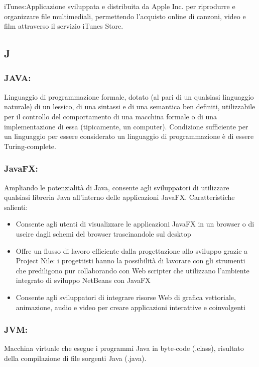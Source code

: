 iTunes:Applicazione sviluppata e distribuita da Apple Inc. per riprodurre e
organizzare file multimediali, permettendo l'acquisto online di canzoni, video e
film attraverso il servizio iTunes Store.

\subsection*{\huge{J}}
\subsubsection*{JAVA:} Linguaggio di programmazione formale, dotato (al pari di
un qualsiasi linguaggio naturale) di un lessico, di una sintassi e di una semantica ben
definiti, utilizzabile per il controllo del comportamento di una macchina
formale o di una implementazione di essa (tipicamente, un computer). Condizione
sufficiente per un linguaggio per essere considerato un linguaggio di
programmazione \`e di essere Turing-complete.

\subsubsection*{JavaFX:} Ampliando le potenzialit\`a di Java, consente agli
sviluppatori di utilizzare qualsiasi libreria Java all'interno delle applicazioni JavaFX.
Caratteristiche salienti:
\begin{itemize}
\item Consente agli utenti di visualizzare le applicazioni JavaFX in un browser
o di uscire dagli schemi del browser trascinandole sul desktop 
\item Offre un flusso di lavoro efficiente dalla progettazione allo sviluppo
grazie a Project Nile: i progettisti hanno la possibilit\`a di lavorare con gli strumenti
che prediligono pur collaborando con Web scripter che utilizzano l'ambiente
integrato di sviluppo NetBeans con JavaFX
\item Consente agli sviluppatori di integrare risorse Web di grafica vettoriale,
animazione, audio e video per creare applicazioni interattive e coinvolgenti
\end{itemize}

\subsubsection*{JVM:} Macchina virtuale che esegue i programmi Java in byte-code
(.class), risultato della compilazione di file sorgenti Java (.java).

